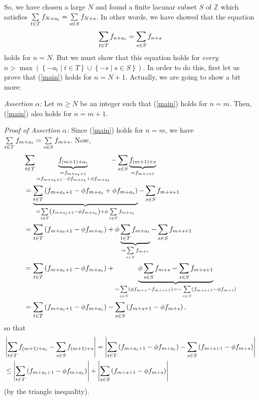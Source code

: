 \documentclass[numbers=enddot,12pt,final,onecolumn,notitlepage]{scrartcl}%
\numberwithin{exer}{section}
\theoremstyle{definition}
\let\sumnonlimits\sum
\renewcommand{\sum}{\sumnonlimits\limits}
\begin{document}
So, we have chosen a large $N$ and found a finite lacunar subset $S$ of
$\mathbb{Z}$ which satisfies $\sum\limits_{t\in T}f_{N+a_{t}}=\sum
\limits_{s\in S}f_{N+s}$. In other words, we have showed that the equation
\begin{equation}
\sum\limits_{t\in T}f_{n+a_{t}}=\sum\limits_{s\in S}f_{n+s} \label{main}%
\end{equation}
holds for $n=N$. But we must show that this equation holds for \textit{every}
$n>\max\left(  \left\{  -a_{t}\mid t\in T\right\}  \cup\left\{  -s\mid s\in
S\right\}  \right)  $. In order to do this, first let us prove that
(\ref{main}) holds for $n=N+1$. Actually, we are going to show a bit more:

\textit{Assertion }$\alpha$\textit{:} Let $m\geq N$ be an integer such that
(\ref{main}) holds for $n=m$. Then, (\ref{main}) also holds for $n=m+1$.

\textit{Proof of Assertion }$\alpha$\textit{:} Since (\ref{main}) holds for
$n=m$, we have $\sum\limits_{t\in T}f_{m+a_{t}}=\sum\limits_{s\in S}f_{m+s}$.
Now,%
\begin{align*}
&  \sum\limits_{t\in T}\underbrace{f_{\left(  m+1\right)  +a_{t}}%
}_{\substack{=f_{m+a_{t}+1}\\=f_{m+a_{t}+1}-\phi f_{m+a_{t}}+\phi f_{m+a_{t}}%
}}-\sum\limits_{s\in S}\underbrace{f_{\left(  m+1\right)  +s}}_{=f_{m+s+1}}\\
&  =\underbrace{\sum\limits_{t\in T}\left(  f_{m+a_{t}+1}-\phi f_{m+a_{t}%
}+\phi f_{m+a_{t}}\right)  }_{=\sum\limits_{t\in T}\left(  f_{m+a_{t}+1}-\phi
f_{m+a_{t}}\right)  +\phi\sum\limits_{t\in T}f_{m+a_{t}}}-\sum\limits_{s\in
S}f_{m+s+1}\\
&  =\sum\limits_{t\in T}\left(  f_{m+a_{t}+1}-\phi f_{m+a_{t}}\right)
+\phi\underbrace{\sum\limits_{t\in T}f_{m+a_{t}}}_{=\sum\limits_{s\in
S}f_{m+s}}-\sum\limits_{s\in S}f_{m+s+1}\\
&  =\sum\limits_{t\in T}\left(  f_{m+a_{t}+1}-\phi f_{m+a_{t}}\right)
+\underbrace{\phi\sum\limits_{s\in S}f_{m+s}-\sum\limits_{s\in S}f_{m+s+1}%
}_{=\sum\limits_{s\in S}\left(  \phi f_{m+s}-f_{m+s+1}\right)  =-\sum
\limits_{s\in S}\left(  f_{m+s+1}-\phi f_{m+s}\right)  }\\
&  =\sum\limits_{t\in T}\left(  f_{m+a_{t}+1}-\phi f_{m+a_{t}}\right)
-\sum\limits_{s\in S}\left(  f_{m+s+1}-\phi f_{m+s}\right)  ,
\end{align*}
so that%
\begin{align}
&  \left\vert \sum\limits_{t\in T}f_{\left(  m+1\right)  +a_{t}}%
-\sum\limits_{s\in S}f_{\left(  m+1\right)  +s}\right\vert =\left\vert
\sum\limits_{t\in T}\left(  f_{m+a_{t}+1}-\phi f_{m+a_{t}}\right)
-\sum\limits_{s\in S}\left(  f_{m+s+1}-\phi f_{m+s}\right)  \right\vert
\nonumber\\
&  \leq\left\vert \sum\limits_{t\in T}\left(  f_{m+a_{t}+1}-\phi f_{m+a_{t}%
}\right)  \right\vert +\left\vert \sum\limits_{s\in S}\left(  f_{m+s+1}-\phi
f_{m+s}\right)  \right\vert \label{Estimate1}%
\end{align}
(by the triangle inequality).
\end{document}
